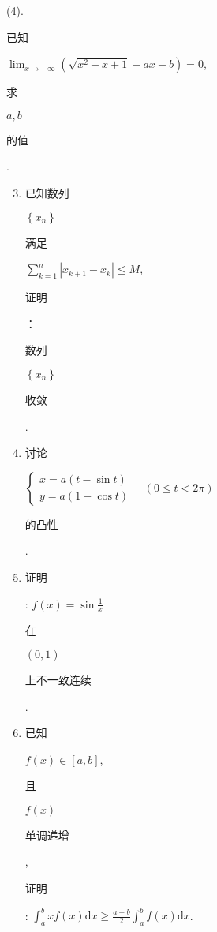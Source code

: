 \documentclass[10pt]{article}
\begin{document}
(4). \begin{CJK}{UTF8}{mj}已知\end{CJK} $\lim _{x \rightarrow-\infty}\left(\sqrt{x^{2}-x+1}-a x-b\right)=0$, \begin{CJK}{UTF8}{mj}求\end{CJK} $a, b$ \begin{CJK}{UTF8}{mj}的值\end{CJK}.

\begin{enumerate}
  \setcounter{enumi}{2}
  \item \begin{CJK}{UTF8}{mj}已知数列\end{CJK} $\left\{x_{n}\right\}$ \begin{CJK}{UTF8}{mj}满足\end{CJK} $\sum_{k=1}^{n}\left|x_{k+1}-x_{k}\right| \leq M$, \begin{CJK}{UTF8}{mj}证明\end{CJK}：\begin{CJK}{UTF8}{mj}数列\end{CJK} $\left\{x_{n}\right\}$ \begin{CJK}{UTF8}{mj}收敛\end{CJK}.

  \item \begin{CJK}{UTF8}{mj}讨论\end{CJK} $\left\{\begin{array}{l}x=a(t-\sin t) \\ y=a(1-\cos t)\end{array} \quad(0 \leq t<2 \pi)\right.$ \begin{CJK}{UTF8}{mj}的凸性\end{CJK}.

  \item \begin{CJK}{UTF8}{mj}证明\end{CJK}: $f(x)=\sin \frac{1}{x}$ \begin{CJK}{UTF8}{mj}在\end{CJK} $(0,1)$ \begin{CJK}{UTF8}{mj}上不一致连续\end{CJK}.

  \item \begin{CJK}{UTF8}{mj}已知\end{CJK} $f(x) \in[a, b]$, \begin{CJK}{UTF8}{mj}且\end{CJK} $f(x)$ \begin{CJK}{UTF8}{mj}单调递增\end{CJK}, \begin{CJK}{UTF8}{mj}证明\end{CJK}: $\int_{a}^{b} x f(x) \mathrm{d} x \geq \frac{a+b}{2} \int_{a}^{b} f(x) \mathrm{d} x$.


\end{enumerate}
\end{document}
